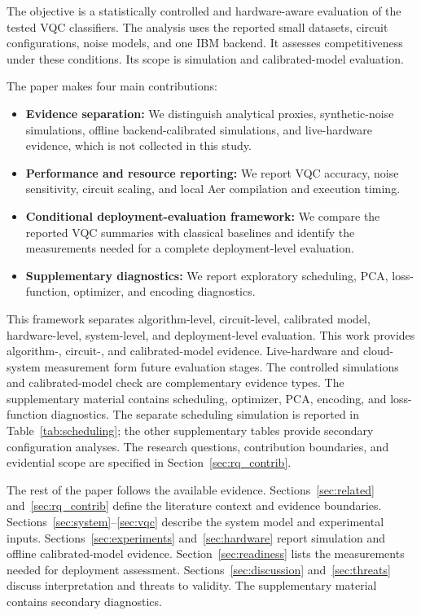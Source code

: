 \documentclass[final,5p,times,number]{elsarticle}
\begin{document}
The objective is a statistically controlled and hardware-aware evaluation of the tested VQC classifiers. The analysis uses the reported small datasets, circuit configurations, noise models, and one IBM backend. It assesses competitiveness under these conditions. Its scope is simulation and calibrated-model evaluation.

The paper makes four main contributions:
\begin{itemize}[leftmargin=*]
  \item \textbf{Evidence separation:} We distinguish analytical proxies, synthetic-noise simulations, offline backend-calibrated simulations, and live-hardware evidence, which is not collected in this study.
  \item \textbf{Performance and resource reporting:} We report VQC accuracy, noise sensitivity, circuit scaling, and local Aer compilation and execution timing.
  \item \textbf{Conditional deployment-evaluation framework:} We compare the reported VQC summaries with classical baselines and identify the measurements needed for a complete deployment-level evaluation.
  \item \textbf{Supplementary diagnostics:} We report exploratory scheduling, PCA, loss-function, optimizer, and encoding diagnostics.
\end{itemize}

This framework separates algorithm-level, circuit-level, calibrated model, hardware-level, system-level, and deployment-level evaluation. This work provides algorithm-, circuit-, and calibrated-model evidence. Live-hardware and cloud-system measurement form future evaluation stages. The controlled simulations and calibrated-model check are complementary evidence types. The supplementary material contains scheduling, optimizer, PCA, encoding, and loss-function diagnostics. The separate scheduling simulation is reported in Table~\ref{tab:scheduling}; the other supplementary tables provide secondary configuration analyses. The research questions, contribution boundaries, and evidential scope are specified in Section~\ref{sec:rq_contrib}.

The rest of the paper follows the available evidence. Sections~\ref{sec:related} and~\ref{sec:rq_contrib} define the literature context and evidence boundaries. Sections~\ref{sec:system}--\ref{sec:vqc} describe the system model and experimental inputs. Sections~\ref{sec:experiments} and~\ref{sec:hardware} report simulation and offline calibrated-model evidence. Section~\ref{sec:readiness} lists the measurements needed for deployment assessment. Sections~\ref{sec:discussion} and~\ref{sec:threats} discuss interpretation and threats to validity. The supplementary material contains secondary diagnostics.
\end{document}
